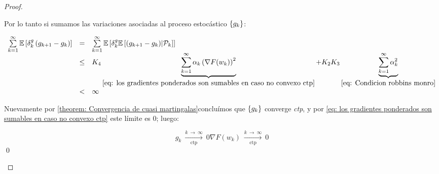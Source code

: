 \begin{proof}
\begin{enumerate}
		 Por lo tanto si sumamos las variaciones asociadas al proceso estoc\'astico $\left\lbrace g_k\right\rbrace$:
		 
		 \begin{equation}
		 \begin{array}{rcl}
		 \sum\limits_{k=1}^{\infty} {\mathbb{E} \left[\delta_k^{g} \left(g_{k+1} - g_k\right)\right]} & = & \sum\limits_{k=1}^{\infty} {\mathbb{E} \left[\delta_k^{g} \mathbb{E} \left[{\left(g_{k+1} - g_k\right)} \vert \mathcal{P}_{k}\right]\right]} \\
		 & \leq & K_4 \underbrace{\sum\limits_{k=1}^{\infty} {\alpha_k \left(\nabla F(w_k)\right)^2}}_{\ref{eq: los gradientes ponderados son sumables en caso no convexo ctp}} + K_2K_3 \underbrace{\sum\limits_{k=1}^{\infty} {\alpha_k^2}}_{\ref{eq: Condicion robbins monro}} \\
		 & < &  \infty
		 \end{array}
		 \end{equation}
		 
		 Nuevamente por \ref{theorem: Convergencia de cuasi martingalas}conclu\'imos que $\left\lbrace g_k\right\rbrace$ converge \textit{ctp}, y por \ref{eq: los gradientes ponderados son sumables en caso no convexo ctp} este l\'imite es $0$; luego:
		 
		 	\begin{subequations}
		 	\begin{equation}
		 	g_k \ \xrightarrow[\text{ctp}]{k \ \rightarrow \ \infty } \ 0
		 	\end{equation}
		 	\begin{equation}
		 	\nabla F(w_k) \ \xrightarrow[\text{ctp}]{k \ \rightarrow \ \infty } \ 0
		 	\end{equation}
		 \end{subequations}
		 \qed
	\end{enumerate}
	
\end{proof}